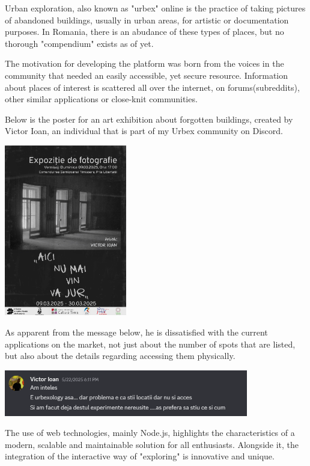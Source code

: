 \documentclass[12pt,a4paper]{report}
\begin{document}
Urban exploration, also known as "urbex" online is the practice of taking pictures of abandoned buildings, usually in urban areas, for artistic or documentation purposes. In Romania, there is an abudance of these types of places, but no thorough "compendium" exists as of yet.

The motivation for developing the platform was born from the voices in the community that needed an easily accessible, yet secure resource. Information about places of interest is scattered all over the internet, on forums(subreddits), other similar applications or close-knit communities.

Below is the poster for an art exhibition about forgotten buildings, created by Victor Ioan, an individual that is part of my Urbex community on Discord.

\begin{center}
\includegraphics[width=0.4\textwidth]{images/expozitie.jpg}
\end{center}

As apparent from the message below, he is dissatisfied with the current applications on the market, not just about the number of spots that are listed, but also about the details regarding accessing them physically.

\begin{center}
\includegraphics[width=0.8\textwidth]{images/mesaj.png}
\end{center}

The use of web technologies, mainly Node.js, highlights the characteristics of a modern, scalable and maintainable solution for all enthusiasts. Alongside it, the integration of the interactive way of "exploring" is innovative and unique.
\end{document}
